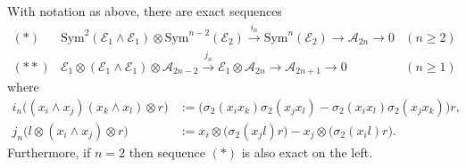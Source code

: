 \documentclass{amsart}
\begin{document}
\begin{prop} \label{Aseqs} With notation as above, there are exact sequences
\[\begin{array}{lcl} (*) & {\mathrm{Sym}}^2({\mathcal{E}}_1 \wedge {\mathcal{E}}_1) \otimes {\mathrm{Sym}}^{n-2}({\mathcal{E}}_2) \stackrel{i_n}{\longrightarrow} {\mathrm{Sym}}^n({\mathcal{E}}_2) \longrightarrow {\mathcal{A}}_{2n} \longrightarrow 0 & (n \geq 2) \\
(**) & {\mathcal{E}}_1 \otimes ({\mathcal{E}}_1 \wedge {\mathcal{E}}_1) \otimes {\mathcal{A}}_{2n-2} \stackrel{j_n}{\longrightarrow} {\mathcal{E}}_1 \otimes {\mathcal{A}}_{2n} \longrightarrow {\mathcal{A}}_{2n+1} \longrightarrow 0 & (n \geq 1) \end{array}\]
where
\begin{align*} i_n\big((x_i \wedge x_j)(x_k \wedge x_l) \otimes r\big) & := \big(\sigma_2 (x_i x_k) \sigma_2 (x_j x_l) - \sigma_2 (x_i x_l)\sigma_2 (x_j x_k)\big)r,\\
j_n\big(l \otimes (x_i \wedge x_j) \otimes r\big) & := x_i \otimes \big(\sigma_2 (x_j l)r) - x_j \otimes (\sigma_2 (x_i l)r\big).
\end{align*}
Furthermore, if $n=2$ then sequence $(*)$ is also exact on the left.
\end{prop}
\end{document}
